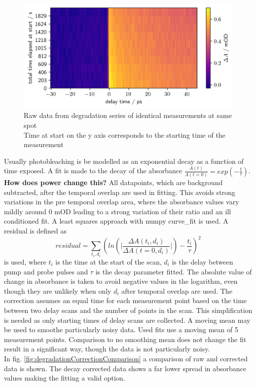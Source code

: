 \documentclass[twoside,openright]{scrreprt}
\begin{document}
\begin{figure}[hbtp]
\centering
\includegraphics[width=\linewidth]{images/DegradationRAWPump653Probe493.png}
\caption{Raw data from degradation series of identical measurements at same spot\\
Time at start on the y axis corresponds to the starting time of the measurement\label{fig:rawDegradation}}
\end{figure}
Usually photobleaching is be modelled as an exponential decay as a function of time exposed. A fit is made to the decay of the absorbance $\frac{A\left(t\right)}{A\left(t=0\right)} = exp(-\frac{t}{\tau})$. \textbf{How does power change this?}
All datapoints, which are background subtracted, after the temporal overlap are used in fitting. This avoids strong variations in the pre temporal overlap area, where the absorbance values vary mildly around 0 mOD leading to a strong variation of their ratio and an ill conditioned fit. A least squares approach with numpy curve\_fit is used. A residual is defined as
\begin{equation}
residual = \sum_{t_i,d_i} \left(ln\left(\lvert\frac{\Delta A(t_i,d_i)}{\Delta A(t=0,d_i)}\rvert\right)- \frac{t_i}{\tau}\right)^2
\end{equation}
is used, where $t_i$ is the time at the start of the scan, $d_i$ is the delay between pump and probe pulses and $\tau$ is the decay parameter fitted. The absolute value of change in absorbance is taken to avoid negative values in the logarithm, even though they are unlikely when only $d_i$ after temporal overlap are used. The correction assumes an equal time for each measurement point based on the time between two delay scans and the number of points in the scan. This simplification is needed as only starting times of delay scans are collected. A moving mean may be used to smoothe particularly noisy data. Used fits use a moving mean of 5 measurement points. Comparison to no smoothing mean does not change the fit result in a significant way, though the data is not particularly noisy.\\
In fig. \ref{fig:degradationCorrectionComparison} a comparison of raw and corrected data is shown. The decay corrected data shows a far lower spread in absorbance values making the fitting a valid option. \\
\end{document}
